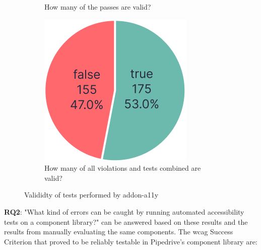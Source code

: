 \documentclass{master_thesis}
\begin{document}
\begin{figure}[ht]
\begin{subfigure}{0.3\textwidth}
	\caption{How many of the passes are valid?}
	\label{fig:checks-validity-passed}
	\end{subfigure}
	\hspace{0.03\textwidth}
	\begin{subfigure}{0.3\textwidth}
	\includegraphics[width=\textwidth]{img/violations+passes.png}
	\caption{How many of all violations and tests combined are valid?}
	\label{fig:checks-validity-all}
	\end{subfigure}
\caption{Valididty of tests performed by addon-a11y}
\label{fig:checks-validity}
\end{figure}

\textbf{RQ2}: "What kind of errors can be caught by running automated accessibility tests on a component library?" can be answered based on these results and the results from manually evaluating the same components. The \ac{wcag} Success Criterion that proved to be reliably testable in Pipedrive's component library are:
\end{document}
